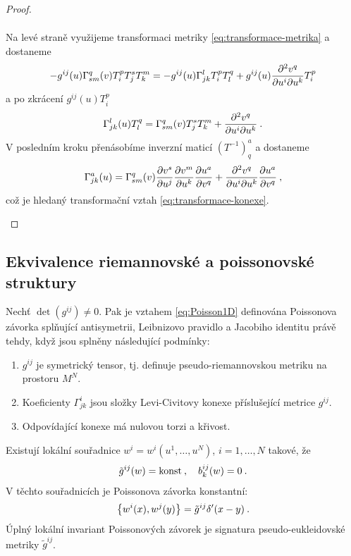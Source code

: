 \begin{proof}
\begin{enumerate}
\begin{align}
        \end{align}
        Na levé straně využijeme transformaci metriky \eqref{eq:transformace-metrika} a dostaneme
        \begin{align}
            -g^{ij}(u) \Gamma^q_{sm}(v) T^p_i T^s_j T^m_k = - g^{ij}(u) \Gamma^l_{jk} T^p_i T^q_l + g^{ij}(u) \frac{\partial^2 v^q}{\partial u^i \partial u^k} T^p_i 
        \end{align}
        a po zkrácení $g^{ij}(u) T^p_i$
        \begin{align}
            \Gamma^l_{jk}(u) T^q_l = \Gamma^q_{sm}(v) T^s_j T^m_k + \frac{\partial^2 v^q}{\partial u^i \partial u^k} \:.
        \end{align}
        V posledním kroku přenásobíme inverzní maticí $(T^{-1})^a_q$ a dostaneme
        \begin{align}
            \Gamma^a_{jk}(u) = \Gamma^q_{sm}(v) \frac{\partial v^s}{\partial u^j} \frac{\partial v^m}{\partial u^k} \frac{\partial u^a}{\partial v^q} + \frac{\partial^2 v^q}{\partial u^i \partial u^k} \frac{\partial u^a}{\partial v^q} \:,
        \end{align}
        což je hledaný transformační vztah \eqref{eq:transformace-konexe}.
    \end{enumerate}
\end{proof}

\subsection{Ekvivalence riemannovské a poissonovské struktury}


\begin{theorem} \label{theorem1:ekvivalence}
    Nechť $\det(g^{ij}) \neq 0$. Pak je vztahem \eqref{eq:Poisson1D} definována Poissonova závorka splňující antisymetrii, Leibnizovo pravidlo a Jacobiho identitu právě tehdy, když jsou splněny následující podmínky:
    \begin{enumerate}
        \item $g^{ij}$ je symetrický tensor, tj. definuje pseudo-riemannovskou metriku na prostoru $M^N$.
        \item Koeficienty $\Gamma^{i}_{jk}$ jsou složky Levi-Civitovy konexe příslušející metrice $g^{ij}$.
        \item Odpovídající konexe má nulovou torzi a křivost.
    \end{enumerate}
\end{theorem}

\begin{corollary*}
    Existují lokální souřadnice $w^i = w^i(u^1, \dots, u^N)$, $i = 1, \dots, N$ takové, že
    \begin{align}
        \tilde g^{ij}(w) = \mathrm{konst} \:, \quad b^{ij}_k (w) = 0 \:.
    \end{align}
    V těchto souřadnicích je Poissonova závorka konstantní:
    \begin{align}
        \left \lbrace w^i(x),w^j(y) \right \rbrace = \tilde{g}^{ij} \delta'(x-y) \:.
    \end{align}
    Úplný lokální invariant Poissonových závorek je signatura pseudo-eukleidovské metriky $\tilde g^{ij}$.
\end{corollary*}

